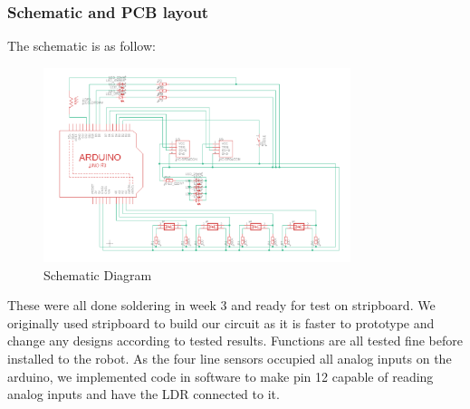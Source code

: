 \documentclass{article}
\begin{document}
\subsubsection{Schematic and PCB layout}
\quad The schematic is as follow:

\begin{figure}[!h]
    \centering
    \includegraphics[width=0.8\textwidth]{assets/Schematic.png}
    \caption{Schematic Diagram}
    \label{fig:sche}
\end{figure}
These were all done soldering in week 3 and ready for test on stripboard. We originally used stripboard to build our circuit as it is faster to prototype and change any designs according to tested results. Functions are all tested fine before installed to the robot.
As the four line sensors occupied all analog inputs on the arduino, we implemented code in software to make pin 12 capable of  reading analog inputs and have the LDR connected to it.
\end{document}
